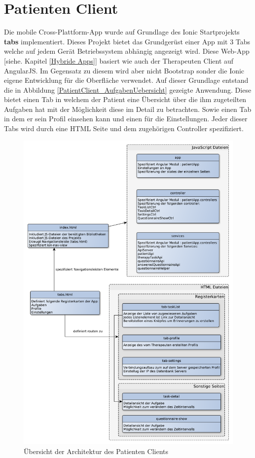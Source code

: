 \section{Patienten Client}\label{_ImpPatientClient}
Die mobile Cross-Plattform-App wurde auf Grundlage des Ionic Startprojekts \textbf{tabs} implementiert. Dieses Projekt bietet das Grundgerüst einer App mit 3 Tabs welche auf jedem Gerät Betriebssystem abhängig angezeigt wird. Diese Web-App [siehe. Kapitel \ref{Hybride Apps}] basiert wie auch der Therapeuten Client auf AngularJS. Im Gegensatz zu diesem wird aber nicht Bootstrap sonder die Ionic eigene Entwicklung für die Oberfläche verwendet. Auf dieser Grundlage entstand die in Abbildung \ref{PatientClient_AufgabenUebersicht} gezeigte Anwendung. Diese bietet einen Tab in welchem der Patient eine Übersicht über die ihm zugeteilten Aufgaben hat mit der Möglichkeit diese im Detail zu betrachten. Sowie einen Tab in dem er sein Profil einsehen kann und einen für die Einstellungen. Jeder dieser Tabs wird durch eine HTML Seite und dem zugehörigen Controller spezifiziert. 

\begin{figure}[H]
	\centering
	\includegraphics[scale=0.52]{images/PatientenClientArchitektur}
	\caption[Übersicht der Architektur des Patienten Clients]{Übersicht der Architektur des Patienten Clients}
	\label{PatientenClientArchitektur}
\end{figure}

